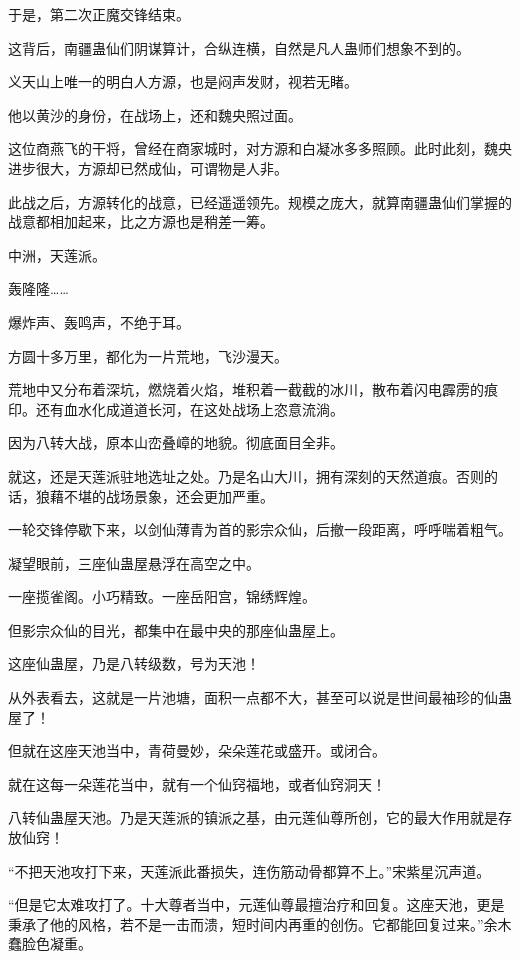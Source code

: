 \begin{this_body}
于是，第二次正魔交锋结束。

这背后，南疆蛊仙们阴谋算计，合纵连横，自然是凡人蛊师们想象不到的。

义天山上唯一的明白人方源，也是闷声发财，视若无睹。

他以黄沙的身份，在战场上，还和魏央照过面。

这位商燕飞的干将，曾经在商家城时，对方源和白凝冰多多照顾。此时此刻，魏央进步很大，方源却已然成仙，可谓物是人非。

此战之后，方源转化的战意，已经遥遥领先。规模之庞大，就算南疆蛊仙们掌握的战意都相加起来，比之方源也是稍差一筹。

中洲，天莲派。

轰隆隆……

爆炸声、轰鸣声，不绝于耳。

方圆十多万里，都化为一片荒地，飞沙漫天。

荒地中又分布着深坑，燃烧着火焰，堆积着一截截的冰川，散布着闪电霹雳的痕印。还有血水化成道道长河，在这处战场上恣意流淌。

因为八转大战，原本山峦叠嶂的地貌。彻底面目全非。

就这，还是天莲派驻地选址之处。乃是名山大川，拥有深刻的天然道痕。否则的话，狼藉不堪的战场景象，还会更加严重。

一轮交锋停歇下来，以剑仙薄青为首的影宗众仙，后撤一段距离，呼呼喘着粗气。

凝望眼前，三座仙蛊屋悬浮在高空之中。

一座揽雀阁。小巧精致。一座岳阳宫，锦绣辉煌。

但影宗众仙的目光，都集中在最中央的那座仙蛊屋上。

这座仙蛊屋，乃是八转级数，号为天池！

从外表看去，这就是一片池塘，面积一点都不大，甚至可以说是世间最袖珍的仙蛊屋了！

但就在这座天池当中，青荷曼妙，朵朵莲花或盛开。或闭合。

就在这每一朵莲花当中，就有一个仙窍福地，或者仙窍洞天！

八转仙蛊屋天池。乃是天莲派的镇派之基，由元莲仙尊所创，它的最大作用就是存放仙窍！

“不把天池攻打下来，天莲派此番损失，连伤筋动骨都算不上。”宋紫星沉声道。

“但是它太难攻打了。十大尊者当中，元莲仙尊最擅治疗和回复。这座天池，更是秉承了他的风格，若不是一击而溃，短时间内再重的创伤。它都能回复过来。”余木蠢脸色凝重。


\end{this_body}
